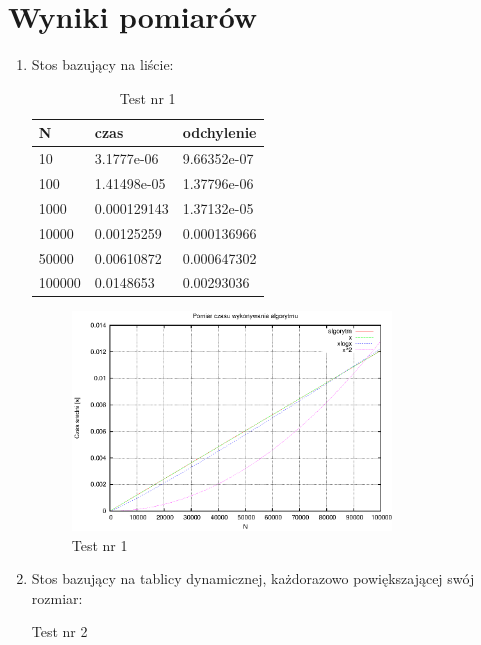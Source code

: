 \documentclass[a4paper,11pt]{article}
\begin{document}
\section{Wyniki pomiarów}
\begin{enumerate}
 \item Stos bazujący na liście:
   
  \begin{table}[th]
    \caption{Test nr 1}

      \begin{tabular}{l|l|l}
	\hline
	N & czas & odchylenie \\
    \hline
  10 & 3.1777e-06 & 9.66352e-07\\
  \hline
100 & 1.41498e-05 & 1.37796e-06\\
\hline
1000 & 0.000129143 & 1.37132e-05\\
\hline
10000 & 0.00125259 & 0.000136966\\
\hline
50000 & 0.00610872 & 0.000647302\\
\hline
100000 & 0.0148653 & 0.00293036\\
\hline
    \end{tabular}
    \end{table}
    \newpage
 \begin{figure}[th]
\centering
\includegraphics[width=0.8\textwidth]{wykres1.eps}
\caption{Test nr 1}
\label{Test nr 1}
\end{figure} 
\item Stos bazujący na tablicy dynamicznej, każdorazowo powiększającej swój rozmiar:

  \begin{table}[th]
    \caption{Test nr 2}


\end{table}
\end{enumerate}
\end{document}
